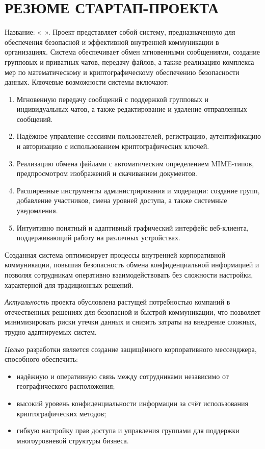 \section*{РЕЗЮМЕ СТАРТАП-ПРОЕКТА}
Название: «\ ». Проект представляет собой систему, предназначенную для обеспечения безопасной и эффективной внутренней коммуникации в организациях. Система обеспечивает обмен мгновенными сообщениями, создание групповых и приватных чатов, передачу файлов, а также реализацию комплекса мер по математическому и криптографическому обеспечению безопасности данных. Ключевые возможности системы включают:

\begin{enumerate}
	\item Мгновенную передачу сообщений с поддержкой групповых и индивидуальных чатов, а также редактирование и удаление отправленных сообщений.
	\item Надёжное управление сессиями пользователей, регистрацию, аутентификацию и авторизацию с использованием криптографических ключей.
	\item Реализацию обмена файлами с автоматическим определением MIME-типов, предпросмотром изображений и скачиванием документов.
	\item Расширенные инструменты администрирования и модерации: создание групп, добавление участников, смена уровней доступа, а также системные уведомления.
	\item Интуитивно понятный и адаптивный графический интерфейс веб-клиента, поддерживающий работу на различных устройствах.
\end{enumerate}

Созданная система оптимизирует процессы внутренней корпоративной коммуникации, повышая безопасность обмена конфиденциальной информацией и позволяя сотрудникам оперативно взаимодействовать без сложности настройки, характерной для традиционных решений.

\textit{Актуальность} проекта обусловлена растущей потребностью компаний в отечественных решениях для безопасной и быстрой коммуникации, что позволяет минимизировать риски утечки данных и снизить затраты на внедрение сложных, трудно адаптируемых систем.

\textit{Целью} разработки является создание защищённого корпоративного мессенджера, способного обеспечить:
\begin{itemize}
	\item надёжную и оперативную связь между сотрудниками независимо от географического расположения;
	\item высокий уровень конфиденциальности информации за счёт использования криптографических методов;
	\item гибкую настройку прав доступа и управления группами для поддержки многоуровневой структуры бизнеса.
\end{itemize}

